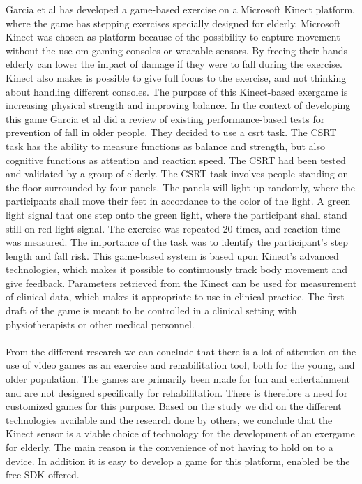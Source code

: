 Garcia et al has developed a game-based exercise on a Microsoft Kinect platform, where the game has stepping exercises specially designed for elderly. Microsoft Kinect was chosen as platform because of the possibility to capture movement without the use om gaming consoles or wearable sensors. By freeing their hands elderly can lower the impact of damage if they were to fall during the exercise. Kinect also makes is possible to give full focus to the exercise, and not thinking about handling different consoles. The purpose of this Kinect-based exergame is increasing physical strength and improving balance. In the context of developing this game Garcia et al did a review of existing performance-based tests for prevention of fall in older people. They decided to use a \ac{csrt} task. The CSRT task has the ability to measure functions as balance and strength, but also cognitive functions as attention and reaction speed. The CSRT had been tested and validated by a group of elderly. The CSRT task involves people standing on the floor surrounded by four panels. The panels will light up randomly, where the participants shall move their feet in accordance to the color of the light. A green light signal that one step onto the green light, where the participant shall stand still on red light signal. The exercise was repeated 20 times, and reaction time was measured. The importance of the task was to identify the participant's step length and fall risk. This game-based system is based upon Kinect's advanced technologies, which makes it possible to continuously track body movement and give feedback. Parameters retrieved from the Kinect can be used for measurement of clinical data, which makes it appropriate to use in clinical practice. The first draft of the game is meant to be controlled in a clinical setting with physiotherapists or other medical personnel. \cite{garcia2012exergames} \\ \\
From the different research we can conclude that there is a lot of attention on the use of video games as an exercise and rehabilitation tool, both for the young, and older population. The games are primarily been made for fun and entertainment and are not designed specifically for rehabilitation. There is therefore a need for customized games for this purpose. Based on the study we did on the different technologies available and the research done by others, we conclude that the Kinect sensor is a viable choice of technology for the development of an exergame for elderly. The main reason is the convenience of not having to hold on to a device. In addition it is easy to develop a game for this platform, enabled be the free SDK offered. 





